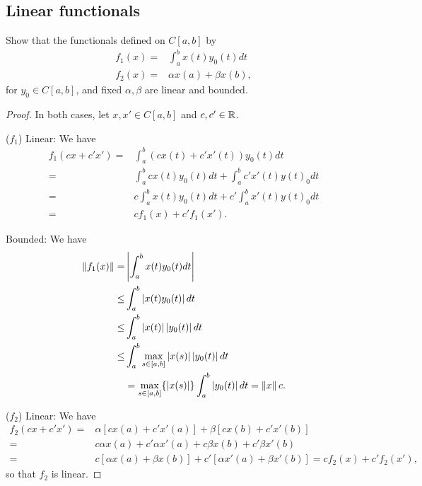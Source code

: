 \subsection{Linear functionals}


\begin{exercise}{2}
Show that the functionals defined on $C[a,b]$ by 
\begin{align*}
    f_1(x) =& \int_a^b x(t)y_0(t)dt\\
    f_2(x) =& \alpha x(a) +\beta x(b),
\end{align*}
for $y_0\in C[a,b]$, and fixed $\alpha,\beta$ are linear and bounded.
\end{exercise}
\begin{proof}
In both cases, let $x,x'\in C[a,b]$ and $c,c'\in \mathbb{R}$.

($f_1$) 
Linear: 
We have 
\begin{align*}
    f_1(cx+c'x') 
    =& \int_a^b(cx(t)+c'x'(t))y_0(t) dt\\
    =& \int_a^b cx(t)y_0(t)dt + \int_a^b c'x'(t)y(t)_0dt\\
    =& c\int_a^b x(t)y_0(t)dt + c'\int_a^b x'(t)y(t)_0dt\\
    =& cf_1(x)+c'f_1(x').
\end{align*}

Bounded: 
We have
\begin{align*}
    \left\lVert f_1(x)\right\rVert
    =& \left\lvert \int_a^b x(t)y_0(t)dt\right\rvert\\
    \leq& \int_a^b \left\lvert x(t)y_0(t)\right\rvert dt\\
    \leq& \int_a^b \left\lvert x(t)\right\rvert\left\lvert y_0(t)\right\rvert dt\\
    \leq& \int_a^b \max_{s\in[a,b]}\left\lvert x(s)\right\rvert\left\lvert y_0(t)\right\rvert dt\\
    &= \max_{s\in[a,b]}\{\left\lvert x(s)\right\rvert\} \int_a^b\left\lvert y_0(t)\right\rvert dt =\left\lVert x\right\rVert c.
\end{align*}

($f_2$)
Linear:
We have
\begin{align*}
    f_2(cx +c'x')
    =& \alpha [cx(a)+c'x'(a)] +\beta [cx(b)+c'x'(b)]\\
    =& c\alpha x(a)+ c'\alpha x'(a) 
    +c\beta x(b) + c'\beta x'(b)\\
    =& c[\alpha x(a) +\beta x(b)]
    + c'[\alpha x'(a) +\beta x'(b)] = cf_2(x)+c'f_2(x'),
\end{align*}
so that $f_2$ is linear.


\end{proof}
